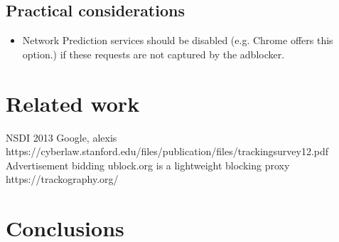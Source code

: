 \documentclass{sig-alternate}
\begin{document}
\subsection{Practical considerations}
\begin{itemize}
	\item Network Prediction services should be disabled (e.g. Chrome offers this option.) if these requests are not captured by the adblocker.
\end{itemize}

\section{Related work}
NSDI 2013 Google, alexis
https://cyberlaw.stanford.edu/files/publication/files/trackingsurvey12.pdf
Advertisement bidding
ublock.org is a lightweight blocking proxy
https://trackography.org/

\section{Conclusions} \label{sec:conclusions}



\end{document}
